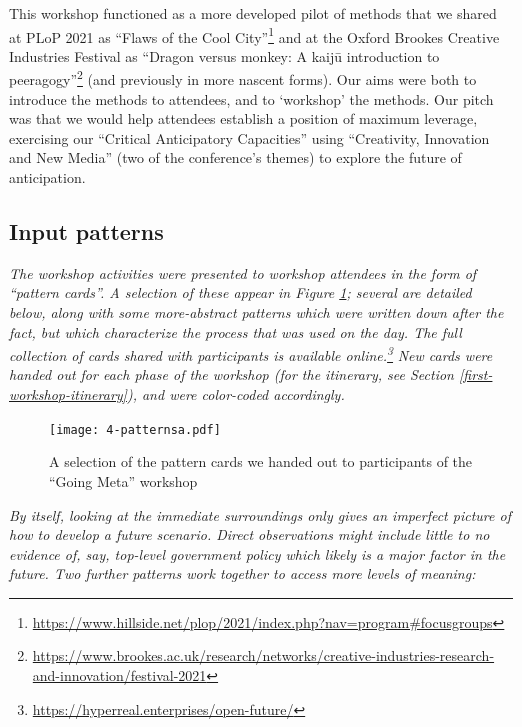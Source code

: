 \documentclass[acmlarge,timestamp]{acmart}
\begin{document}
This workshop functioned as a more developed pilot of methods that we
shared at PLoP 2021 as “Flaws of the Cool
City”\footnote{\url{https://www.hillside.net/plop/2021/index.php?nav=program\#focusgroups}}
and at the Oxford Brookes Creative Industries Festival as “Dragon
versus monkey: A kaijū introduction to
peeragogy”\footnote{\url{https://www.brookes.ac.uk/research/networks/creative-industries-research-and-innovation/festival-2021}}
(and previously in more nascent forms).  Our aims were both to
introduce the methods to attendees, and to ‘workshop’ the methods.
Our pitch was that we would help attendees establish a position of
maximum leverage, exercising our “Critical Anticipatory Capacities”
using “Creativity, Innovation and New Media” (two of the conference’s
themes) to explore the future of anticipation.

\subsection{Input patterns} \label{case1-inputs}

\emph{The workshop activities were presented to workshop attendees in
the form of “pattern cards”.  A selection of these appear in Figure
\ref{cards}; several are detailed below, along with some more-abstract
patterns which were written down after the fact, but which characterize the
process that was used on the day.  The full collection of cards shared
with participants is available
online.\footnote{\url{https://hyperreal.enterprises/open-future/}}}
\emph{New cards were handed out for each phase of the workshop (for
the itinerary, see Section \ref{first-workshop-itinerary}), and were
color-coded accordingly.}

\begin{figure}
  \texttt{[image: 4-patternsa.pdf]}
\caption{A selection of the pattern cards we handed out to participants of the “Going Meta” workshop\label{cards}}
\end{figure}



\smallskip
\noindent \emph{By itself, looking at the immediate surroundings only
gives an imperfect picture of how to develop a future scenario.
Direct observations might include little to no evidence of, say,
top-level government policy which likely is a major factor in the
future.  Two further patterns work together to access more levels of
meaning:}


\end{document}

